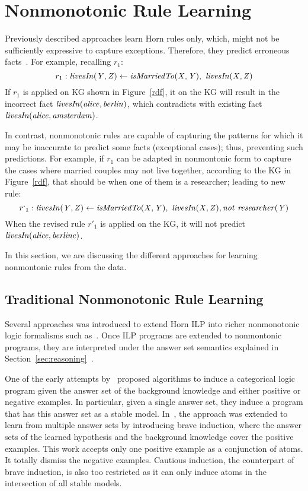 \section{Nonmonotonic Rule Learning}\label{sec:nmrulelearn}

Previously described approaches learn Horn rules only, which, might not be sufficiently expressive to capture
exceptions. Therefore, they predict erroneous facts~\cite{rumis}. For example, recalling $r_1$:
\[r_1 : \mathit{livesIn(Y,Z)} \leftarrow \mathit{isMarriedTo(X,Y)},\ \mathit{livesIn(X,Z)} \]
If $r_1$ is applied on KG shown in Figure~\ref{rdf}, it on the KG will result in the incorrect fact $\mathit{livesIn(alice,berlin)}$, which contradicts with existing fact $\mathit{livesIn(alice, amsterdam)}$. 

In contrast, nonmonotonic rules are capable of capturing the patterns for which it may be inaccurate to predict some facts (\ie exceptional cases); thus, preventing such predictions. For example, if $r_1$ can be adapted in nonmontonic form to capture the cases where married couples may not live together, according to the KG in Figure~\ref{rdf}, that should be when one of them is a researcher; leading to new rule:
\[r`_1 : \mathit{livesIn(Y,Z)} \leftarrow \mathit{isMarriedTo(X,Y)},\ \mathit{livesIn(X,Z)}, \mathit{not}~ \mathit{researcher(Y)}\]
When the revised rule $r'_1$ is applied on the KG, it will not predict $\mathit{livesIn(alice,berline)}$. 

In this section, we are discussing the different approaches for learning nonmontonic rules from the data.


\subsection{Traditional Nonmonotonic Rule Learning}
Several approaches was introduced to extend Horn ILP into richer nonmonotonic logic formalisms such as~\cite{DBLP:conf/ijcai/InoueK97,DBLP:journals/tocl/Sakama05,R08,CorapiRL10,ILASP_system}. Once ILP programs are extended to nonmontonic programs, they are interpreted under the answer set semantics explained in Section~\ref{sec:reasoning}~\cite{Shakerin2018}.


One of the early attempts by~\cite{DBLP:journals/tocl/Sakama05} proposed algorithms to induce a categorical logic program given the answer set of the background knowledge and either positive or negative examples. In particular, given a single answer set, they induce a program that has this answer set as a stable model. In~\cite{Sakama2009}, the approach was extended to learn from multiple answer sets by introducing brave induction, where the answer sets of the learned hypothesis and the background knowledge cover the positive examples. This work accepts only one positive example as a conjunction of atoms. It totally dismiss the negative examples. Cautious induction, the counterpart of brave induction, is also too restricted as
it can only induce atoms in the intersection of all stable models.


